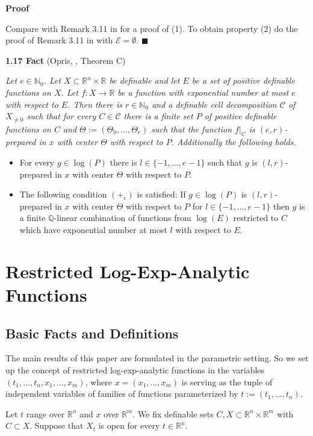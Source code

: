 \documentclass[12pt]{article}
\def\vs{\vspace}
\begin{document}
\vs{0.1cm}
{\bf Proof}

\vs{0.1cm}
Compare with Remark 3.11 in \cite{10} for a proof of (1). To obtain property (2) do the proof of Remark 3.11 in \cite{10} with $\mathcal{E}=\emptyset$. \hfill$\blacksquare$

\vs{0.4cm}
{\bf1.17 Fact} (Opris, \cite{10}, Theorem C)

\vs{0.1cm}
{\it
Let $e \in \mathbb{N}_0$. Let $X \subset \mathbb{R}^n \times \mathbb{R}$ be definable and let $E$ be a set of positive definable functions on $X$. Let $f:X \to \mathbb{R}$ be a function with exponential number at most $e$ with respect to $E$. Then there is $r \in \mathbb{N}_0$ and a definable cell decomposition $\mathcal{C}$ of $X_{\neq 0}$ such that for every $C \in \mathcal{C}$ there is a finite set $P$ of positive definable functions on $C$ and $\Theta:=(\Theta_0,...,\Theta_r)$ such that the function $f|_C$ is $(e,r)$-prepared in $x$ with center $\Theta$ with respect to $P$. Additionally the following holds.
\begin{itemize}
	\item [(1)]
	For every $g \in \log(P)$ there is $l \in \{-1,...,e-1\}$ such that $g$ is $(l,r)$-prepared in $x$ with center $\Theta$ with respect to $P$.
	\item [(2)]
	The following condition $(+_e)$ is satisfied: If $g \in \log(P)$ is $(l,r)$-prepared in $x$ with center $\Theta$ with respect to $P$ for $l \in \{-1,...,e-1\}$ then $g$ is a finite $\mathbb{Q}$-linear combination of functions from $\log(E)$ restricted to $C$ which have exponential number at most $l$ with respect to $E$.
\end{itemize}}

\section{Restricted Log-Exp-Analytic Functions}

\subsection{Basic Facts and Definitions}

The main results of this paper are formulated in the parametric setting. So we set up the concept of restricted log-exp-analytic functions in the variables $(t_1,...,t_n,x_1,...,x_m)$, where $x=(x_1,...,x_m)$ is serving as the tuple of independent variables of families of functions parameterized by $t:=(t_1,...,t_n)$. 

\vs{0.4cm}
Let $t$ range over $\mathbb{R}^n$ and $x$ over $\mathbb{R}^m$. We fix definable sets $C,X \subset \mathbb{R}^n \times \mathbb{R}^m$ with $C \subset X$. Suppose that $X_t$ is open for every $t \in \mathbb{R}^n$.
\end{document}
